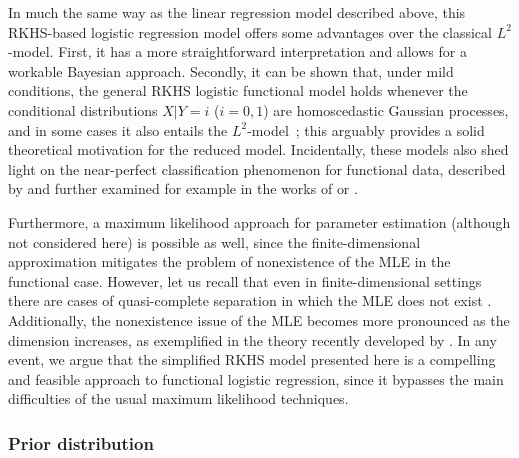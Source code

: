 In much the same way as the linear regression model described above, this \acs{RKHS}-based logistic regression model offers some advantages over the classical \(L^2\)-model. First, it has a more straightforward interpretation and allows for a workable Bayesian approach. Secondly, it can be shown that, under mild conditions, the general \acs{RKHS} logistic functional model holds whenever the conditional distributions \(X | Y=i\) (\(i=0,1\)) are homoscedastic Gaussian processes, and in some cases it also entails the \(L^2\)-model~\citep[see][]{berrendero2023functional}; this arguably provides a solid theoretical motivation for the reduced model. Incidentally, these models also shed light on the near-perfect classification phenomenon for functional data, described by \citet{delaigle2012achieving} and further examined for example in the works of \citet{berrendero2018use} or \citet{torrecilla2020optimal}.

Furthermore, a maximum likelihood approach for parameter estimation (although not considered here) is possible as well, since the finite-dimensional approximation  mitigates the problem of nonexistence of the \acs{MLE} in the functional case. However, let us recall that even in finite-dimensional settings there are cases of quasi-complete separation in which the \acs{MLE} does not exist \citep{albert1984existence}. Additionally, the nonexistence issue of the \acs{MLE} becomes more pronounced as the dimension increases, as exemplified in the theory recently developed by \citet{candes2020phase}. In any event, we argue that the simplified \acs{RKHS} model presented here is a compelling and feasible approach to functional logistic regression, since it bypasses the main difficulties of the usual maximum likelihood techniques.

\subsubsection*{Prior distribution}

